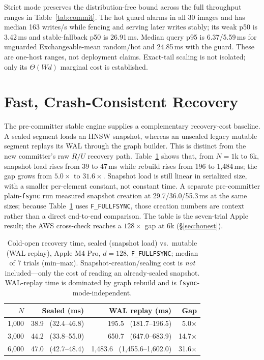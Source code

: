 \documentclass[sigconf,nonacm,balance=false]{acmart}
\newcommand{\fullfsync}{\texttt{F\_FULLFSYNC}}
\newcommand{\fsync}{\texttt{fsync}}
\begin{document}
Strict mode preserves the distribution-free bound across the full throughput
ranges in Table~\ref{tab:commit}. The hot guard alarms in all 30 images and has
median 163 writes/s while fencing and serving later writes stably; its weak p50
is 3.42\,ms and stable-fallback p50 is 26.91\,ms. Median query p95 is
6.37/5.59\,ms for unguarded Exchangeable-mean random/hot and 24.85\,ms with the guard.
These are one-host ranges, not deployment claims. Exact-tail scaling is not
isolated; only its $\Theta(Wd)$ marginal cost is established.

\section{Fast, Crash-Consistent Recovery}
\label{sec:recovery}
The pre-committer stable engine supplies a complementary recovery-cost baseline. A
sealed segment loads an HNSW snapshot, whereas an unsealed legacy mutable segment
replays its WAL through the graph builder. This is distinct from the new
committer's raw $R/U$ recovery path. Table~\ref{tab:recovery} shows that, from
$N=1$k to $6$k, snapshot load rises from 39 to 47\,ms while rebuild rises from
196 to 1{,}484\,ms; the gap grows from $5.0\times$ to $31.6\times$. Snapshot load
is still linear in serialized size, with a smaller per-element constant, not
constant time. A separate pre-committer plain-\fsync{} run measured snapshot
creation at 29.7/36.0/55.3\,ms at the same sizes; because Table~\ref{tab:recovery}
uses \fullfsync{}, those creation numbers are context rather than a direct
end-to-end comparison. The table is the seven-trial Apple result; the AWS
cross-check reaches a $128\times$ gap at 6k (\S\ref{sec:honest}).

\begin{table}[t]
\centering
\caption{Cold-open recovery time, sealed (snapshot load) vs.\ mutable (WAL
replay), Apple M4 Pro, $d{=}128$, \fullfsync{}; median of 7 trials (min--max).
Snapshot-creation/sealing cost is \emph{not} included---only the cost of reading an
already-sealed snapshot. WAL-replay time is dominated by graph rebuild and is
\fsync{}-mode-independent.}
\label{tab:recovery}
\begin{tabular}{rrrr}
\toprule
$N$ & Sealed (ms) & WAL replay (ms) & Gap \\
\midrule
1{,}000 & 38.9 \ (32.4--46.8) & 195.5 \ (181.7--196.5) & 5.0$\times$ \\
3{,}000 & 44.2 \ (33.8--55.0) & 650.7 \ (647.0--683.9) & 14.7$\times$ \\
6{,}000 & 47.0 \ (42.7--48.4) & 1{,}483.6 \ (1{,}455.6--1{,}602.0) & 31.6$\times$ \\
\bottomrule
\end{tabular}
\end{table}
\end{document}
